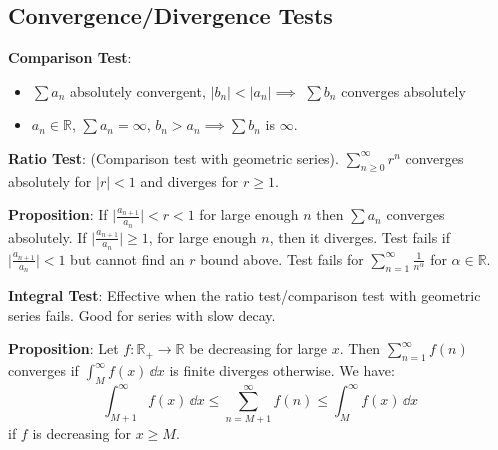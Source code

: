 \documentclass{report}
\begin{document}
\begin{topic}
    \section{Convergence/Divergence Tests}
\end{topic}

\textbf{Comparison Test}:
    \begin{itemize}
        \item $\sum a_{n}$ absolutely convergent, $\lvert b_{n} \rvert < \lvert  a_{n} \rvert \implies$ $\sum b_{n}$ converges absolutely

        \item $a_{n} \in \mathbb{R}$, $\sum a_{n} = \infty$, $b_{n} > a_{n} \implies \sum b_{n} $ is $\infty$. 
    \end{itemize}

\textbf{Ratio Test}: (Comparison test with geometric series). $\sum_{n \geq 0}^{\infty}r^{n}$ converges absolutely for $\lvert r \rvert < 1$ and diverges for $r \geq 1$.

\textbf{Proposition}: If $\lvert \frac{a_{n + 1}}{a_{n}} \rvert < r < 1$ for large enough $n$ then $\sum a_{n}$ converges absolutely. If $\lvert \frac{a_{n + 1}}{a_{n}} \rvert \geq 1$, for large enough $n$, then it diverges. Test fails if $\lvert \frac{a_{n + 1}}{a_{n}} \rvert < 1$ but cannot find an $r$ bound above. Test fails for $\sum_{n = 1}^{\infty} \frac{1}{n^{\alpha}}$ for $\alpha \in \mathbb{R}$.

\textbf{Integral Test}: Effective when the ratio test/comparison test with geometric series fails. Good for series with slow decay.

\textbf{Proposition}: Let $f : \mathbb{R}_{+} \rightarrow \mathbb{R}$ be decreasing for large $x$. Then $\sum_{n = 1}^{\infty} f(n)$ converges if $\int_{M}^{\infty} f(x) \, \dd{x} $ is finite diverges otherwise. We have:
    \begin{equation*}
        \int_{M + 1}^{\infty} f(x) \, \dd{x}  \leq \sum_{n = M + 1}^{\infty}f(n) \leq \int_{M}^{\infty} f(x) \, \dd{x} 
    \end{equation*}
if $f$ is decreasing for $x \geq M$.
\end{document}
